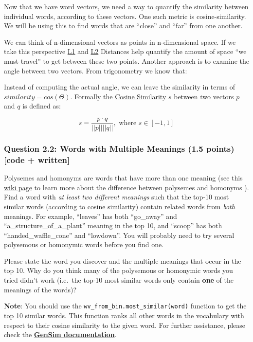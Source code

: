\documentclass[11pt]{article}
\begin{document}
Now that we have word vectors, we need a way to quantify the similarity
between individual words, according to these vectors. One such metric is
cosine-similarity. We will be using this to find words that are
``close'' and ``far'' from one another.

We can think of n-dimensional vectors as points in n-dimensional space.
If we take this perspective
\href{http://mathworld.wolfram.com/L1-Norm.html}{L1} and
\href{http://mathworld.wolfram.com/L2-Norm.html}{L2} Distances help
quantify the amount of space ``we must travel'' to get between these two
points. Another approach is to examine the angle between two vectors.
From trigonometry we know that:

Instead of computing the actual angle, we can leave the similarity in
terms of \(similarity = cos(\Theta)\). Formally the
\href{https://en.wikipedia.org/wiki/Cosine_similarity}{Cosine
Similarity} \(s\) between two vectors \(p\) and \(q\) is defined as:

\[s = \frac{p \cdot q}{||p|| ||q||}, \textrm{ where } s \in [-1, 1] \]

    \subsubsection{Question 2.2: Words with Multiple Meanings (1.5 points)
{[}code +
written{]}}\label{question-2.2-words-with-multiple-meanings-1.5-points-code-written}

Polysemes and homonyms are words that have more than one meaning (see
this \href{https://en.wikipedia.org/wiki/Polysemy}{wiki page} to learn
more about the difference between polysemes and homonyms ). Find a word
with \emph{at least two different meanings} such that the top-10 most
similar words (according to cosine similarity) contain related words
from \emph{both} meanings. For example, ``leaves'' has both ``go\_away''
and ``a\_structure\_of\_a\_plant'' meaning in the top 10, and ``scoop''
has both ``handed\_waffle\_cone'' and ``lowdown''. You will probably
need to try several polysemous or homonymic words before you find one.

Please state the word you discover and the multiple meanings that occur
in the top 10. Why do you think many of the polysemous or homonymic
words you tried didn't work (i.e.~the top-10 most similar words only
contain \textbf{one} of the meanings of the words)?

\textbf{Note}: You should use the
\texttt{wv\_from\_bin.most\_similar(word)} function to get the top 10
similar words. This function ranks all other words in the vocabulary
with respect to their cosine similarity to the given word. For further
assistance, please check the
\textbf{\href{https://radimrehurek.com/gensim/models/keyedvectors.html\#gensim.models.keyedvectors.FastTextKeyedVectors.most_similar}{GenSim
documentation}}.
\end{document}
